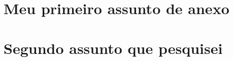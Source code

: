 \documentclass[
	10pt,				%
	oneside,			%
	a4paper,			%
	chapter=TITLE,		%
	english,			%
	brazil				%
	]{abntex2}
\begin{document}
\begin{anexosenv}

\chapter{Meu primeiro assunto de anexo}
\lipsum[30]


\chapter{Segundo assunto que pesquisei}
\lipsum[31]

\end{anexosenv}

\printindex
\end{document}
